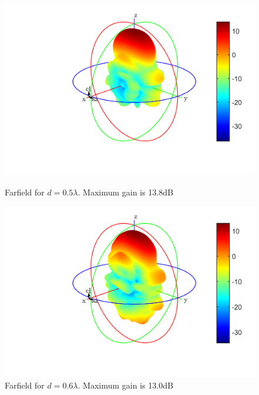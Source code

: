 \begin{figure}[H]
  \centering
  \begin{minipage}[b]{0.5\textwidth}
	\includegraphics[scale = 0.5]{figures/measurement/antennas/array_4_0p5.png}
	\caption{Farfield for $d = 0.5\lambda$. Maximum gain is 13.8dB}
    \label{fig:chamber_four_ant_ff_05}
  \end{minipage}
  \hfill
  \begin{minipage}[b]{0.4\textwidth}
\includegraphics[scale = 0.5]{figures/measurement/antennas/array_4_0p6.png}
\caption{Farfield for $d = 0.6\lambda$. Maximum gain is 13.0dB}
    \label{fig:chamber_four_ant_ff:06}
  \end{minipage}
\end{figure}

